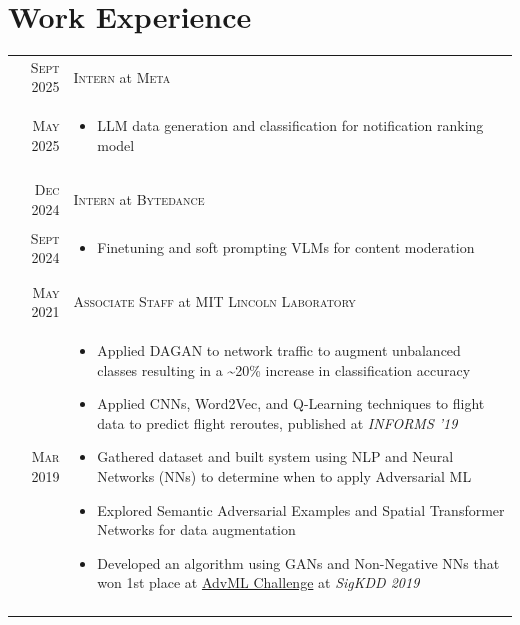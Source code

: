 \documentclass[a4paper,10pt]{article}
\begin{document}
\section{Work Experience}
\begin{tabular}{r|p{11cm}}
\textsc{Sept 2025} & \textsc{Intern} at \textsc{Meta} \\
 \textsc{May 2025} & \small{\vspace{-10pt}\begin{itemize}
 \item LLM data generation and classification for notification ranking model \end{itemize}\vspace{-15pt}}\\\multicolumn{2}{c}{} \\
\textsc{Dec 2024} & \textsc{Intern} at \textsc{Bytedance} \\
 \textsc{Sept 2024} & \small{\vspace{-10pt}\begin{itemize}
 \item Finetuning and soft prompting VLMs for content moderation \end{itemize}\vspace{-15pt}}\\\multicolumn{2}{c}{} \\
 \textsc{May 2021} & \textsc{Associate Staff} at \textsc{MIT Lincoln Laboratory} \\
 \textsc{Mar 2019} & \small{\vspace{-10pt}\begin{itemize}
 \item Applied DAGAN to network traffic to augment unbalanced classes resulting in a \textasciitilde 20\% increase in classification accuracy
 \item Applied CNNs, Word2Vec, and Q-Learning techniques to flight data to predict flight reroutes, published at \textit{INFORMS '19}
 \item Gathered dataset and built system using NLP and Neural Networks (NNs) to determine when to apply Adversarial ML
 \item Explored Semantic Adversarial Examples and Spatial Transformer Networks for data augmentation
 \item Developed an algorithm using GANs and Non-Negative NNs that won 1st place at \href{https://sites.google.com/view/advml/advml19-challenge}{AdvML Challenge} at \textit{SigKDD 2019}\end{itemize}\vspace{-15pt}}\\\multicolumn{2}{c}{} \\

\end{tabular}
\end{document}
